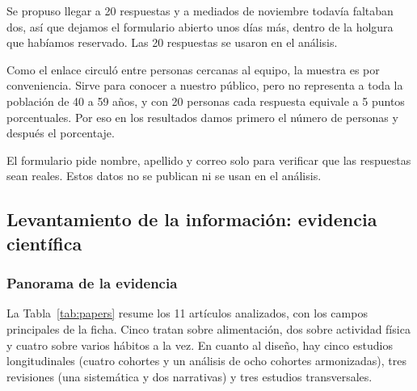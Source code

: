 \documentclass[12pt, letterpaper, table, xcdraw]{extarticle}
\begin{document}
Se propuso llegar a 20 respuestas y a mediados de noviembre todavía faltaban dos, así que dejamos el formulario abierto unos días más, dentro de la holgura que habíamos reservado. Las 20 respuestas se usaron en el análisis.

Como el enlace circuló entre personas cercanas al equipo, la muestra es por conveniencia. Sirve para conocer a nuestro público, pero no representa a toda la población de 40 a 59 años, y con 20 personas cada respuesta equivale a 5 puntos porcentuales. Por eso en los resultados damos primero el número de personas y después el porcentaje.

El formulario pide nombre, apellido y correo solo para verificar que las respuestas sean reales. Estos datos no se publican ni se usan en el análisis.


\subsection{Levantamiento de la información: evidencia científica}
\label{sec:levantamiento}

\subsubsection{Panorama de la evidencia}

La Tabla~\ref{tab:papers} resume los 11 artículos analizados, con los campos principales de la ficha. Cinco tratan sobre alimentación, dos sobre actividad física y cuatro sobre varios hábitos a la vez. En cuanto al diseño, hay cinco estudios longitudinales (cuatro cohortes y un análisis de ocho cohortes armonizadas), tres revisiones (una sistemática y dos narrativas) y tres estudios transversales.
\end{document}
